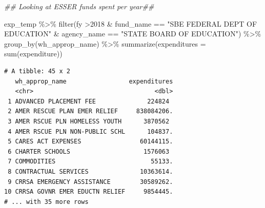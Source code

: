 \documentclass[
  letterpaper,
  DIV=11,
  numbers=noendperiod]{scrreport}
\newenvironment{Shaded}{\begin{snugshade}}{\end{snugshade}}
\newcommand{\AttributeTok}[1]{\textcolor[rgb]{0.40,0.45,0.13}{#1}}
\newcommand{\DecValTok}[1]{\textcolor[rgb]{0.68,0.00,0.00}{#1}}
\newcommand{\DocumentationTok}[1]{\textcolor[rgb]{0.37,0.37,0.37}{\textit{#1}}}
\newcommand{\FunctionTok}[1]{\textcolor[rgb]{0.28,0.35,0.67}{#1}}
\newcommand{\NormalTok}[1]{\textcolor[rgb]{0.00,0.23,0.31}{#1}}
\newcommand{\SpecialCharTok}[1]{\textcolor[rgb]{0.37,0.37,0.37}{#1}}
\newcommand{\StringTok}[1]{\textcolor[rgb]{0.13,0.47,0.30}{#1}}
\begin{document}
\begin{Shaded}
\begin{Highlighting}[]
\DocumentationTok{\#\# Looking at ESSER funds spent per year\#\# }

\NormalTok{exp\_temp }\SpecialCharTok{\%\textgreater{}\%} \FunctionTok{filter}\NormalTok{(fy }\SpecialCharTok{\textgreater{}}\DecValTok{2018} \SpecialCharTok{\&}\NormalTok{ fund\_name }\SpecialCharTok{==} \StringTok{"SBE FEDERAL DEPT OF EDUCATION"} \SpecialCharTok{\&}\NormalTok{ agency\_name }\SpecialCharTok{==} \StringTok{"STATE BOARD OF EDUCATION"}\NormalTok{) }\SpecialCharTok{\%\textgreater{}\%} \FunctionTok{group\_by}\NormalTok{(wh\_approp\_name) }\SpecialCharTok{\%\textgreater{}\%} \FunctionTok{summarize}\NormalTok{(}\AttributeTok{expenditures =} \FunctionTok{sum}\NormalTok{(expenditure))}
\end{Highlighting}
\end{Shaded}

\begin{verbatim}
# A tibble: 45 x 2
   wh_approp_name                 expenditures
   <chr>                                 <dbl>
 1 ADVANCED PLACEMENT FEE              224824 
 2 AMER RESCUE PLAN EMER RELIEF     838084206.
 3 AMER RSCUE PLN HOMELESS YOUTH      3870562 
 4 AMER RSCUE PLN NON-PUBLIC SCHL      104837.
 5 CARES ACT EXPENSES                60144115.
 6 CHARTER SCHOOLS                    1576063 
 7 COMMODITIES                          55133.
 8 CONTRACTUAL SERVICES              10363614.
 9 CRRSA EMERGENCY ASSISTANCE        30589262.
10 CRRSA GOVNR EMER EDUCTN RELIEF     9854445.
# ... with 35 more rows
\end{verbatim}
\end{document}
